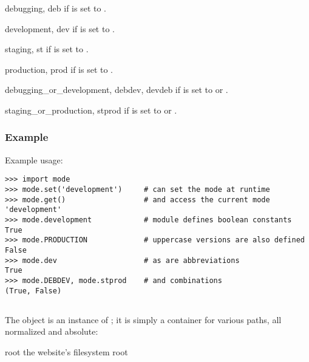 \begin{datadesc}{debugging, deb}
 if  is set to .
\end{datadesc}
\begin{datadesc}{development, dev}
 if  is set to .
\end{datadesc}
\begin{datadesc}{staging, st}
 if  is set to .
\end{datadesc}
\begin{datadesc}{production, prod}
 if  is set to .
\end{datadesc}
\begin{datadesc}{debugging_or_development, debdev, devdeb}
 if  is set to  or .
\end{datadesc}
\begin{datadesc}{staging_or_production, stprod}
 if  is set to  or .
\end{datadesc}


\subsubsection{Example}

Example usage:

\begin{verbatim}
>>> import mode
>>> mode.set('development')     # can set the mode at runtime
>>> mode.get()                  # and access the current mode
'development'
>>> mode.development            # module defines boolean constants
True
>>> mode.PRODUCTION             # uppercase versions are also defined
False
>>> mode.dev                    # as are abbreviations
True
>>> mode.DEBDEV, mode.stprod    # and combinations
(True, False)
\end{verbatim}


\subsection{}
\label{api-paths}

The  object is an instance of
; it is simply a container for various paths,
all normalized and absolute:

\begin{memberdesc}[string]{root}
the website's filesystem root
\end{memberdesc}

